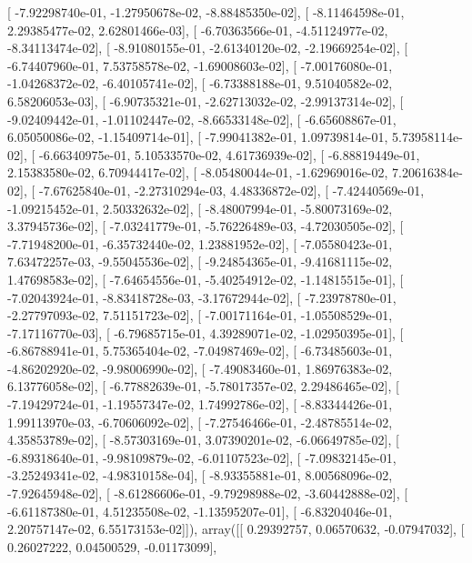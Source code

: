 \documentclass{article}
\begin{document}
       [ -7.92298740e-01,  -1.27950678e-02,  -8.88485350e-02],
       [ -8.11464598e-01,   2.29385477e-02,   2.62801466e-03],
       [ -6.70363566e-01,  -4.51124977e-02,  -8.34113474e-02],
       [ -8.91080155e-01,  -2.61340120e-02,  -2.19669254e-02],
       [ -6.74407960e-01,   7.53758578e-02,  -1.69008603e-02],
       [ -7.00176080e-01,  -1.04268372e-02,  -6.40105741e-02],
       [ -6.73388188e-01,   9.51040582e-02,   6.58206053e-03],
       [ -6.90735321e-01,  -2.62713032e-02,  -2.99137314e-02],
       [ -9.02409442e-01,  -1.01102447e-02,  -8.66533148e-02],
       [ -6.65608867e-01,   6.05050086e-02,  -1.15409714e-01],
       [ -7.99041382e-01,   1.09739814e-01,   5.73958114e-02],
       [ -6.66340975e-01,   5.10533570e-02,   4.61736939e-02],
       [ -6.88819449e-01,   2.15383580e-02,   6.70944417e-02],
       [ -8.05480044e-01,  -1.62969016e-02,   7.20616384e-02],
       [ -7.67625840e-01,  -2.27310294e-03,   4.48336872e-02],
       [ -7.42440569e-01,  -1.09215452e-01,   2.50332632e-02],
       [ -8.48007994e-01,  -5.80073169e-02,   3.37945736e-02],
       [ -7.03241779e-01,  -5.76226489e-03,  -4.72030505e-02],
       [ -7.71948200e-01,  -6.35732440e-02,   1.23881952e-02],
       [ -7.05580423e-01,   7.63472257e-03,  -9.55045536e-02],
       [ -9.24854365e-01,  -9.41681115e-02,   1.47698583e-02],
       [ -7.64654556e-01,  -5.40254912e-02,  -1.14815515e-01],
       [ -7.02043924e-01,  -8.83418728e-03,  -3.17672944e-02],
       [ -7.23978780e-01,  -2.27797093e-02,   7.51151723e-02],
       [ -7.00171164e-01,  -1.05508529e-01,  -7.17116770e-03],
       [ -6.79685715e-01,   4.39289071e-02,  -1.02950395e-01],
       [ -6.86788941e-01,   5.75365404e-02,  -7.04987469e-02],
       [ -6.73485603e-01,  -4.86202920e-02,  -9.98006990e-02],
       [ -7.49083460e-01,   1.86976383e-02,   6.13776058e-02],
       [ -6.77882639e-01,  -5.78017357e-02,   2.29486465e-02],
       [ -7.19429724e-01,  -1.19557347e-02,   1.74992786e-02],
       [ -8.83344426e-01,   1.99113970e-03,  -6.70606092e-02],
       [ -7.27546466e-01,  -2.48785514e-02,   4.35853789e-02],
       [ -8.57303169e-01,   3.07390201e-02,  -6.06649785e-02],
       [ -6.89318640e-01,  -9.98109879e-02,  -6.01107523e-02],
       [ -7.09832145e-01,  -3.25249341e-02,  -4.98310158e-04],
       [ -8.93355881e-01,   8.00568096e-02,  -7.92645948e-02],
       [ -8.61286606e-01,  -9.79298988e-02,  -3.60442888e-02],
       [ -6.61187380e-01,   4.51235508e-02,  -1.13595207e-01],
       [ -6.83204046e-01,   2.20757147e-02,   6.55173153e-02]]), array([[ 0.29392757,  0.06570632, -0.07947032],
       [ 0.26027222,  0.04500529, -0.01173099],
\end{document}
